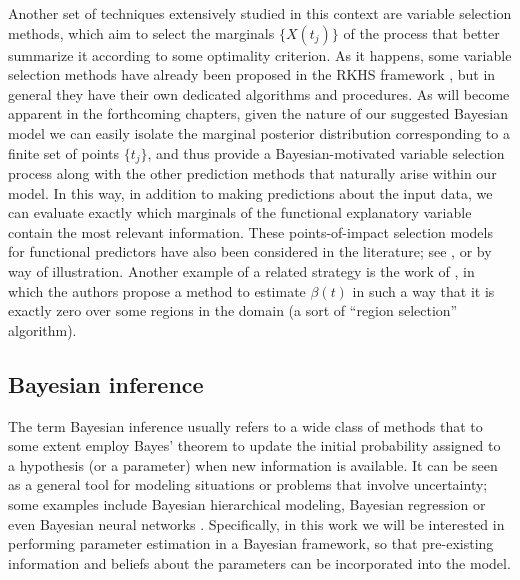 Another set of techniques extensively studied in this context are variable selection methods, which aim to select the marginals \(\{X(t_j)\}\) of the process that better summarize it according to some optimality criterion. As it happens, some variable selection methods have already been proposed in the RKHS framework \citep[see for example][]{berrendero2019rkhs, bueno2019variable}, but in general they have their own dedicated algorithms and procedures. As will become apparent in the forthcoming chapters, given the nature of our suggested Bayesian model we can easily isolate the marginal posterior distribution corresponding to a finite set of points \(\{t_j\}\), and thus provide a Bayesian-motivated variable selection process along with the other prediction methods that naturally arise within our model. In this way, in addition to making predictions about the input data, we can evaluate exactly which marginals of the functional explanatory variable contain the most relevant information. These points-of-impact selection models for functional predictors have also been considered in the  literature; see \citet{poss2020superconsistent}, \citet{berrendero2016variable} or \citet{ferraty2010most} by way of illustration. Another example of a related strategy is the work of \citet{james2009functional}, in which the authors propose a method to estimate \(\beta(t)\) in such a way that it is exactly zero over some regions in the domain (a sort of ``region selection'' algorithm).


\subsection*{Bayesian inference}

The term Bayesian inference usually refers to a wide class of methods that to some extent employ Bayes' theorem to update the initial probability assigned to a hypothesis (or a parameter) when new information is available. It can be seen as a general tool for modeling situations or problems that involve uncertainty; some examples include Bayesian hierarchical modeling, Bayesian regression or even Bayesian neural networks \citep[see e.g.][]{murphy2012machine, bishop2006pattern}. Specifically, in this work we will be interested in performing parameter estimation in a Bayesian framework, so that pre-existing information and beliefs about the parameters can be incorporated into the model.

